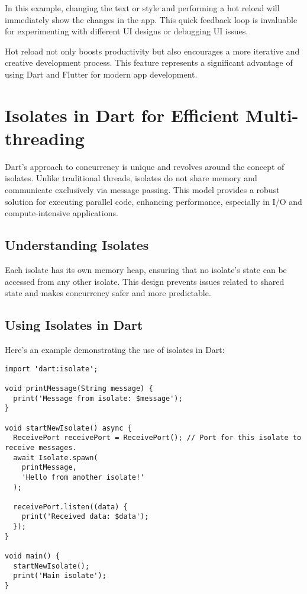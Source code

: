 \documentclass{book}
\begin{document}
In this example, changing the text or style and performing a hot reload will immediately show the changes in the app. This quick feedback loop is invaluable for experimenting with different UI designs or debugging UI issues.

Hot reload not only boosts productivity but also encourages a more iterative and creative development process. This feature represents a significant advantage of using Dart and Flutter for modern app development.

\chapter{Isolates in Dart for Efficient Multi-threading}

Dart's approach to concurrency is unique and revolves around the concept of isolates. Unlike traditional threads, isolates do not share memory and communicate exclusively via message passing. This model provides a robust solution for executing parallel code, enhancing performance, especially in I/O and compute-intensive applications.

\section{Understanding Isolates}
Each isolate has its own memory heap, ensuring that no isolate’s state can be accessed from any other isolate. This design prevents issues related to shared state and makes concurrency safer and more predictable.

\section{Using Isolates in Dart}
Here's an example demonstrating the use of isolates in Dart:

\begin{lstlisting}[style=dartstyle]
import 'dart:isolate';

void printMessage(String message) {
  print('Message from isolate: $message');
}

void startNewIsolate() async {
  ReceivePort receivePort = ReceivePort(); // Port for this isolate to receive messages.
  await Isolate.spawn(
    printMessage, 
    'Hello from another isolate!'
  );

  receivePort.listen((data) {
    print('Received data: $data');
  });
}

void main() {
  startNewIsolate();
  print('Main isolate');
}
\end{lstlisting}
\end{document}
